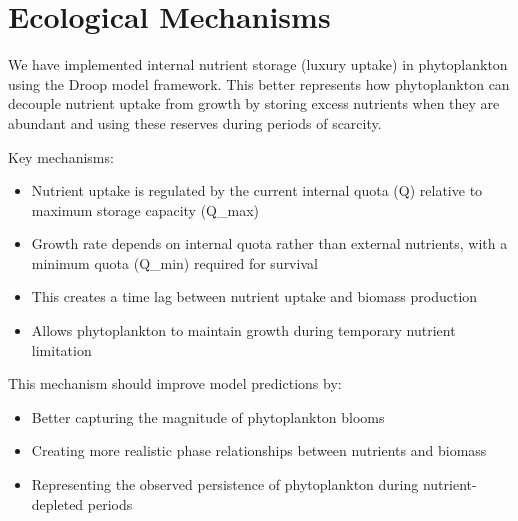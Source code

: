 \section{Ecological Mechanisms}

We have implemented internal nutrient storage (luxury uptake) in phytoplankton using the Droop model framework. This better represents how phytoplankton can decouple nutrient uptake from growth by storing excess nutrients when they are abundant and using these reserves during periods of scarcity.

Key mechanisms:
\begin{itemize}
    \item Nutrient uptake is regulated by the current internal quota (Q) relative to maximum storage capacity (Q\_max)
    \item Growth rate depends on internal quota rather than external nutrients, with a minimum quota (Q\_min) required for survival
    \item This creates a time lag between nutrient uptake and biomass production
    \item Allows phytoplankton to maintain growth during temporary nutrient limitation
\end{itemize}

This mechanism should improve model predictions by:
\begin{itemize}
    \item Better capturing the magnitude of phytoplankton blooms
    \item Creating more realistic phase relationships between nutrients and biomass
    \item Representing the observed persistence of phytoplankton during nutrient-depleted periods
\end{itemize}
